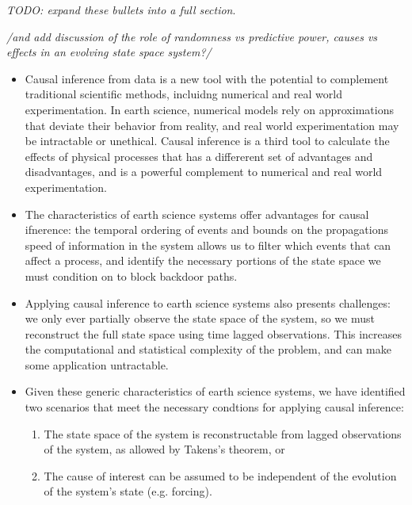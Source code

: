 \documentclass[12pt]{article}
\begin{document}
\emph{TODO: expand these bullets into a full section}.

\emph{/and add discussion of the role of randomness vs predictive
  power, causes vs effects in an evolving state space system?/}

\begin{itemize}
\item Causal inference from data is a new tool with the potential to
  complement traditional scientific methods, incluidng numerical and
  real world experimentation. In earth science, numerical models rely
  on approximations that deviate their behavior from reality, and real
  world experimentation may be intractable or unethical. Causal
  inference is a third tool to calculate the effects of physical
  processes that has a differerent set of advantages and
  disadvantages, and is a powerful complement to numerical and real
  world experimentation.
\item The characteristics of earth science systems offer advantages
  for causal ifnerence: the temporal ordering of events and bounds on
  the propagations speed of information in the system allows us to
  filter which events that can affect a process, and identify the
  necessary portions of the state space we must condition on to block
  backdoor paths.
\item Applying causal inference to earth science systems also presents
  challenges: we only ever partially observe the state space of the
  system, so we must reconstruct the full state space using time
  lagged observations. This increases the computational and
  statistical complexity of the problem, and can make some application
  untractable.
\item Given these generic characteristics of earth science systems, we
  have identified two scenarios that meet the necessary condtions for
  applying causal inference:
  \begin{enumerate}
  \item The state space of the system is reconstructable
    from lagged observations of the system, as allowed by
    Takens's theorem, or
  \item The cause of interest can be assumed to be
    independent of the evolution of the system's state
    (e.g. forcing).
  \end{enumerate}
\end{itemize}





\end{document}
